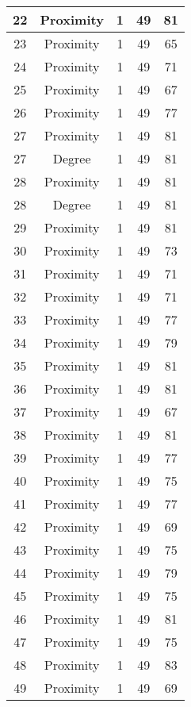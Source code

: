 \documentclass[results.tex]{subfiles}
\begin{document}
\begin{center}
\begin{tabular}{| c || c | c | c | c |}
    \hline
    22 & Proximity & 1 & 49 & 81 \\ 
    \hline
    23 & Proximity & 1 & 49 & 65 \\ 
    \hline
    24 & Proximity & 1 & 49 & 71 \\ 
    \hline
    25 & Proximity & 1 & 49 & 67 \\ 
    \hline
    26 & Proximity & 1 & 49 & 77 \\ 
    \hline
    27 & Proximity & 1 & 49 & 81 \\ 
    \hline
    27 & Degree & 1 & 49 & 81 \\ 
    \hline
    28 & Proximity & 1 & 49 & 81 \\ 
    \hline
    28 & Degree & 1 & 49 & 81 \\ 
    \hline
    29 & Proximity & 1 & 49 & 81 \\ 
    \hline
    30 & Proximity & 1 & 49 & 73 \\ 
    \hline
    31 & Proximity & 1 & 49 & 71 \\ 
    \hline
    32 & Proximity & 1 & 49 & 71 \\ 
    \hline
    33 & Proximity & 1 & 49 & 77 \\ 
    \hline
    34 & Proximity & 1 & 49 & 79 \\ 
    \hline
    35 & Proximity & 1 & 49 & 81 \\ 
    \hline
    36 & Proximity & 1 & 49 & 81 \\ 
    \hline
    37 & Proximity & 1 & 49 & 67 \\ 
    \hline
    38 & Proximity & 1 & 49 & 81 \\ 
    \hline
    39 & Proximity & 1 & 49 & 77 \\ 
    \hline
    40 & Proximity & 1 & 49 & 75 \\ 
    \hline
    41 & Proximity & 1 & 49 & 77 \\ 
    \hline
    42 & Proximity & 1 & 49 & 69 \\ 
    \hline
    43 & Proximity & 1 & 49 & 75 \\ 
    \hline
    44 & Proximity & 1 & 49 & 79 \\ 
    \hline
    45 & Proximity & 1 & 49 & 75 \\ 
    \hline
    46 & Proximity & 1 & 49 & 81 \\ 
    \hline
    47 & Proximity & 1 & 49 & 75 \\ 
    \hline
    48 & Proximity & 1 & 49 & 83 \\ 
    \hline
    49 & Proximity & 1 & 49 & 69 \\ 
    \hline   \end{tabular}
\end{center}
\end{document}
